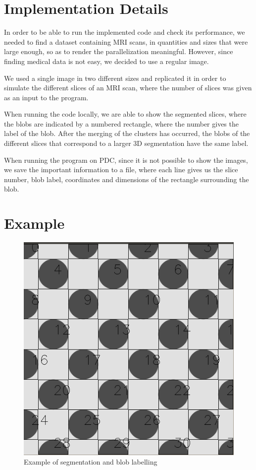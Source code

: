 \documentclass[a4paper,12pt]{article}
\begin{document}
	
\section{Implementation Details}
In order to be able to run the implemented code and check its performance, we needed to find a dataset containing MRI scans, in quantities and sizes that were large enough, so as to render the parallelization meaningful. However, since finding medical data is not easy, we decided to use a regular image.

We used a single image in two different sizes and replicated it in order to simulate the different slices of an MRI scan, where the number of slices was given as an input to the program.

When running the code locally, we are able to show the segmented slices, where the blobs are indicated by a numbered rectangle, where the number gives the label of the blob. After the merging of the clusters has occurred, the blobs of the different slices that correspond to a larger 3D segmentation have the same label.

When running the program on PDC, since it is not possible to show the images, we save the important information to a file, where each line gives us the slice number, blob label, coordinates and dimensions of the rectangle surrounding the blob.

\section{Example}
\begin{figure}
  \centering
  \includegraphics[scale=0.5]{example.png}
  \caption{Example of segmentation and blob labelling}
  \label{example}
\end{figure}
\end{document}
